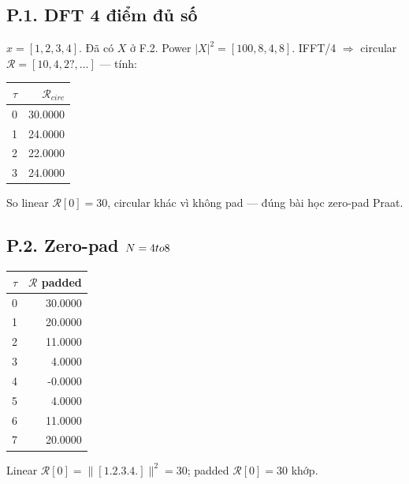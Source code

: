 \subsection*{P.1. DFT 4 điểm đủ số}
$x=[1,2,3,4]$. Đã có $X$ ở F.2. Power $|X|^2=[100,8,4,8]$. IFFT/4 $\Rightarrow$ circular $\mathcal{R}=[10,4,2?,...]$ --- tính:
\begin{center}\small\begin{tabular}{@{}rr@{}}\toprule $\tau$ & $\mathcal{R}_{circ}$ \\ \midrule
0 & 30.0000 \\
1 & 24.0000 \\
2 & 22.0000 \\
3 & 24.0000 \\
\bottomrule\end{tabular}\end{center}
So linear $\mathcal{R}[0]=30$, circular khác vì không pad --- đúng bài học zero-pad Praat.
\subsection*{P.2. Zero-pad $N=4\\to8$}
\begin{center}\small\begin{tabular}{@{}rr@{}}\toprule $\tau$ & $\mathcal{R}$ padded \\ \midrule
0 & 30.0000 \\
1 & 20.0000 \\
2 & 11.0000 \\
3 & 4.0000 \\
4 & -0.0000 \\
5 & 4.0000 \\
6 & 11.0000 \\
7 & 20.0000 \\
\bottomrule\end{tabular}\end{center}
Linear $\mathcal{R}[0]=\|[1. 2. 3. 4.]\|^2=30$; padded $\mathcal{R}[0]=30$ khớp.